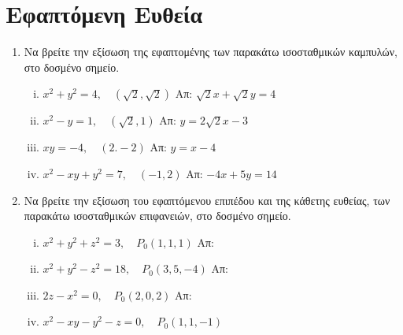 




\geometry{left=15.63mm,right=15.63mm,top=28.25mm,bottom=34.25mm,
footskip=24.16mm,headsep=24.16mm}

\pagestyle{askhseis}
\everymath{\displaystyle}



\begin{center}
\minibox{\large\bfseries \textcolor{Col1}{Εφαπτόμενο Επίπεδο, Εφαπτόμενη και Κάθετη Ευθεία}}
\end{center}

\vspace{\baselineskip}

\section*{Εφαπτόμενη Ευθεία}



\begin{enumerate}
\item Να βρείτε την εξίσωση της εφαπτομένης των παρακάτω ισοσταθμικών καμπυλών, στο
  δοσμένο σημείο.
  \begin{enumerate}[i)]
    \item $ x^{2}+y^{2} = 4, \quad (\sqrt{2} , \sqrt{2}) $ 
      \hfill Απ: $ \sqrt{2} x + \sqrt{2} y = 4 $
    \item $ x^{2}-y=1, \quad (\sqrt{2} ,1) $ \hfill Απ: $ y=2 \sqrt{2} x - 3 $
    \item $ xy=-4, \quad (2.-2) $ \hfill Απ: $ y=x-4 $
    \item $ x^{2}-xy+y^{2}=7, \quad (-1,2) $ \hfill Απ: $ -4x+5y=14 $
  \end{enumerate}

\item Να βρείτε την εξίσωση του εφαπτόμενου επιπέδου και της κάθετης ευθείας, των 
  παρακάτω ισοσταθμικών επιφανειών, στο δοσμένο σημείο.
  \begin{enumerate}[i)]
    \item $ x^{2}+y^{2}+z^{2}=3, \quad P_{0}(1,1,1) $ \hfill Απ:  
    \item $ x^{2}+y^{2}-z^{2}=18, \quad P_{0}(3,5,-4) $ \hfill Απ: 
    \item $ 2z-x^{2}=0, \quad P_{0}(2,0,2) $ \hfill Απ: 
    \item $ x^{2}-xy-y^{2}-z=0, \quad P_{0}(1,1,-1) $
  \end{enumerate}
\end{enumerate}


